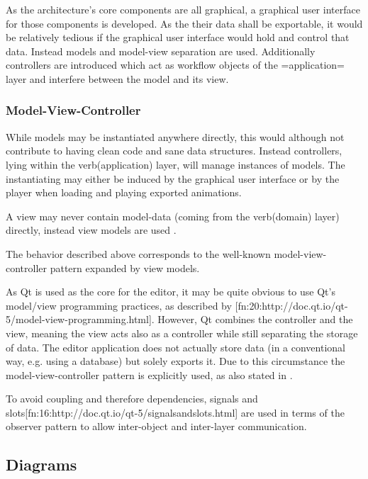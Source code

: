 \documentclass[
    a4paper,      %
    10pt,         %
    openright,    %
    notitlepage,  %
    parskip=half, %
]{scrreprt}       %
\theoremstyle{definition}                    %
\begin{document}
As the architecture's core  components are all graphical, a graphical user
interface for those components is developed. As the their data shall be
exportable, it would be relatively tedious if the graphical user interface would
hold and control that data. Instead models and model-view separation are used.
Additionally controllers are introduced which act as workflow objects of the
=application= layer and interfere between the model and its view.

\subsubsection{Model-View-Controller}
\label{ssubsec:mvc}

While models may be instantiated anywhere directly, this would although not
contribute to having clean code and sane data structures. Instead controllers,
lying within the {{{verb(application)}}} layer, will manage instances of models.
The instantiating may either be induced by the graphical user interface
or by the player when loading and playing exported animations.

A view may never contain model-data (coming from the {{{verb(domain)}}} layer)
directly, instead view models are used \cite{martin_fowler_presentation_2004}.

The behavior described above corresponds to the well-known model-view-controller
pattern expanded by view models.

As Qt is used as the core for the editor, it may be quite obvious to use Qt's
model/view programming practices, as described by
[fn:20:http://doc.qt.io/qt-5/model-view-programming.html]. However, Qt combines
the controller and the view, meaning the view acts also as a controller while
still separating the storage of data. The editor application does not actually
store data (in a conventional way, e.g. using a database) but solely exports it.
Due to this circumstance the model-view-controller pattern is explicitly used,
as also stated in \cite[p. 38]{osterwalder_qde_2016}.


To avoid coupling and therefore dependencies, signals and
slots[fn:16:http://doc.qt.io/qt-5/signalsandslots.html] are used in terms of the
observer pattern to allow inter-object and inter-layer communication.

\subsection{Diagrams}
\label{subsec:diagrams}
\end{document}
